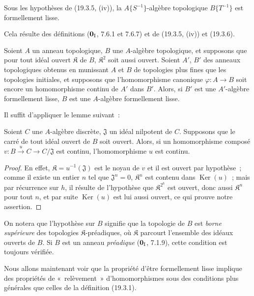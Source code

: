 \begin{corollary}[19.3.7]
\label{0.19.3.7-fr}
Sous les hypothèses de \textup{(19.3.5, (iv))}, la $A\{S^{-1}\}$-algèbre topologique
$B\{T^{-1}\}$ est formellement lisse.
\end{corollary}

Cela résulte des définitions ($\mathbf 0_{\rm I}$, 7.6.1 et 7.6.7) et de
(19.3.5, (iv)) et (19.3.6).

\begin{proposition}[19.3.8]
\label{0.19.3.8-fr}
Soient $A$ un anneau topologique, $B$ une $A$-algèbre topologique, et supposons
que pour tout idéal ouvert $\mathfrak K$ de $B$, $\mathfrak K^2$ soit aussi
ouvert. Soient $A'$, $B'$ des anneaux topologiques obtenus en munissant $A$ et
$B$ de topologies plus fines que les topologies initiales, et supposons que
l'homomorphisme canonique $\varphi:A\to B$ soit encore un homomorphisme
continu de $A'$ dans $B'$. Alors, si $B'$ est une $A'$-algèbre formellement
lisse, $B$ est une $A$-algèbre formellement lisse.
\end{proposition}

Il suffit d'appliquer le lemme suivant~:

\begin{lemma}[19.3.8.1]
\label{0.19.3.8.1-fr}
Soient $C$ une $A$-algèbre discrète, $\mathfrak J$ un idéal nilpotent de $C$.
Supposons que le carré de tout idéal ouvert de $B$ soit ouvert. Alors, si un
homomorphisme composé
$v:B\xrightarrow{u}C\to C/\mathfrak J$ est continu, l'homomorphisme $u$
est continu.
\end{lemma}

\begin{proof}
En effet, $\mathfrak K=u^{-1}(\mathfrak J)$ est le noyau de $v$ et il est
ouvert par hypothèse~; comme il existe un entier $n$ tel que
$\mathfrak J^n=0$, $\mathfrak K^n$ est contenu dans
$\operatorname{Ker}(u)$~; mais par récurrence sur $h$, il résulte de
l'hypothèse que $\mathfrak K^{2^h}$ est ouvert, donc aussi
$\mathfrak K^n$ pour tout $n$, et par suite $\operatorname{Ker}(u)$ est lui
aussi ouvert, ce qui prouve notre assertion.
\end{proof}

On notera que l'hypothèse sur $B$ signifie que la topologie de $B$ est \emph{borne
supérieure} des topologies $\mathfrak K$-préadiques, où $\mathfrak K$ parcourt
l'ensemble des idéaux ouverts de $B$. Si $B$ est un anneau \emph{préadique}
($\mathbf 0_{\rm I}$, 7.1.9), cette condition est toujours vérifiée.

\begin{env}[19.3.9]
\label{0.19.3.9-fr}
Nous allons maintenant voir que la propriété d'être formellement lisse
implique des propriétés de «~relèvement~» d'homomorphismes sous des conditions
plus générales que celles de la définition (19.3.1).
\end{env}

